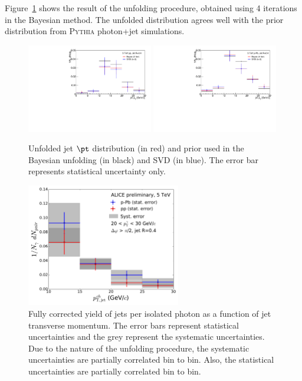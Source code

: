 Figure~\ref{fig:UnfoldedResultFinal} shows the result of the unfolding procedure, obtained using 4 iterations in the Bayesian method. The unfolded distribution agrees well with the prior distribution from \textsc{Pythia} photon+jet simulations. 

\begin{figure}
\center
\includegraphics[width=0.49\textwidth]{JetResponse/Unfoldedresultpp}
\includegraphics[width=0.49\textwidth]{JetResponse/UnfoldedresultpPb}
\caption{Unfolded jet $\pt$ distribution (in red) and prior used in the Bayesian unfolding (in black) and SVD (in blue). The error bar represents statistical uncertainty only.\label{fig:UnfoldedResultFinal}
}
\end{figure}

\begin{figure}
\center
	\includegraphics[width=0.6\textwidth]{JetResponse/Central_values.pdf}
	\caption{Fully corrected yield of jets per isolated photon as a function of jet transverse momentum. The error bars represent statistical uncertainties and the grey represent the systematic uncertainties. Due to the nature of the unfolding procedure, the systematic uncertainties are partially correlated bin to bin. Also, the statistical uncertainties are partially correlated bin to bin.}
	\label{fig:centralvalues}
\end{figure}

